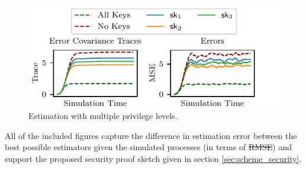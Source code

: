 \documentclass[letterpaper, 10 pt, conference]{ieeeconf}
\providecommand{\DIFadd}[1]{{\protect\color{blue}\uwave{#1}}} %
\providecommand{\DIFdel}[1]{{\protect\color{red}\sout{#1}}}                      %
\providecommand{\DIFaddbegin}{} %
\providecommand{\DIFaddend}{} %
\providecommand{\DIFdelbegin}{} %
\providecommand{\DIFdelend}{} %
\providecommand{\DIFaddbeginFL}{} %
\providecommand{\DIFaddendFL}{} %
\newcommand{\DIFscaledelfig}{0.5}
\newlength{\DIFdelgraphicswidth} %
\newlength{\DIFdelgraphicsheight} %
\newcommand{\DIFaddincludegraphics}[2][]{{\color{blue}\fbox{\DIFOincludegraphics[#1]{#2}}}} %
\newcommand{\DIFdelincludegraphics}[2][]{%
\sbox{\DIFdelgraphicsbox}{\DIFOincludegraphics[#1]{#2}}%
\settoboxwidth{\DIFdelgraphicswidth}{\DIFdelgraphicsbox} %
\settoboxtotalheight{\DIFdelgraphicsheight}{\DIFdelgraphicsbox} %
\scalebox{\DIFscaledelfig}{%
\parbox[b]{\DIFdelgraphicswidth}{\usebox{\DIFdelgraphicsbox}\\[-\baselineskip] \rule{\DIFdelgraphicswidth}{0em}}\llap{\resizebox{\DIFdelgraphicswidth}{\DIFdelgraphicsheight}{%
\setlength{\unitlength}{\DIFdelgraphicswidth}%
\begin{picture}(1,1)%
\thicklines\linethickness{2pt} %
{\color[rgb]{1,0,0}\put(0,0){\framebox(1,1){}}}%
{\color[rgb]{1,0,0}\put(0,0){\line( 1,1){1}}}%
{\color[rgb]{1,0,0}\put(0,1){\line(1,-1){1}}}%
\end{picture}%
}\hspace*{3pt}}} %
} %
\DeclareRobustCommand{\DIFaddbegin}{\DIFOaddbegin \let\includegraphics\DIFaddincludegraphics} %
\DeclareRobustCommand{\DIFaddend}{\DIFOaddend \let\includegraphics\DIFOincludegraphics} %
\DeclareRobustCommand{\DIFdelbegin}{\DIFOdelbegin \let\includegraphics\DIFdelincludegraphics} %
\DeclareRobustCommand{\DIFdelend}{\DIFOaddend \let\includegraphics\DIFOincludegraphics} %
\DeclareRobustCommand{\DIFaddbeginFL}{\DIFOaddbeginFL \let\includegraphics\DIFaddincludegraphics} %
\DeclareRobustCommand{\DIFaddendFL}{\DIFOaddendFL \let\includegraphics\DIFOincludegraphics} %
\begin{document}
\begin{figure}[htbp]
   \centering
   \DIFaddbeginFL \vspace{-.5 \baselineskip}
   \DIFaddendFL \includegraphics{pictures/multiple_level.pdf}
   \caption{Estimation with multiple privilege levels.}
   \DIFaddbeginFL \vspace{-.5 \baselineskip}
   \DIFaddendFL \label{fig:multiple_bounded}
\end{figure}

All of the included figures capture the difference in estimation error between the best possible estimators given the simulated processes (in terms of \DIFdelbegin \DIFdel{RMSE}\DIFdelend \DIFaddbegin \DIFadd{MSE}\DIFaddend ) and support the proposed security proof sketch given in section \ref{sec:scheme_security}.

% 
%                                               
%                                               
%                                               
% 
\end{document}

